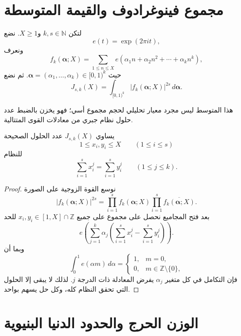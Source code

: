 \section{مجموع فينوغرادوف والقيمة المتوسطة}

\begin{definition}
\label{def:ch25-vinogradov-mean-value}
\provedhere
لتكن \(k,s\in\mathbb N\) و\(X\ge1\). نضع
\[
e(t)=\exp(2\pi i t),
\]
ونعرف
\[
f_k(\boldsymbol\alpha;X)
=
\sum_{1\le n\le X}
e\!\left(\alpha_1n+\alpha_2n^2+\cdots+\alpha_kn^k\right),
\]
حيث \(\boldsymbol\alpha=(\alpha_1,\ldots,\alpha_k)\in[0,1)^k\). ثم نضع
\[
J_{s,k}(X)
=
\int_{[0,1)^k}
\left|f_k(\boldsymbol\alpha;X)\right|^{2s}
\,d\boldsymbol\alpha.
\]
\end{definition}

هذا المتوسط ليس مجرد معيار تحليلي لحجم مجموع أسي؛ فهو يخزن بالضبط عدد حلول نظام جبري من معادلات القوى المتتالية.

\begin{proposition}
\label{prop:ch25-orthogonality-count}
\provedhere
يساوي \(J_{s,k}(X)\) عدد الحلول الصحيحة
\[
1\le x_i,y_i\le X\qquad(1\le i\le s)
\]
للنظام
\[
\sum_{i=1}^{s}x_i^j
=
\sum_{i=1}^{s}y_i^j
\qquad(1\le j\le k).
\]
\end{proposition}

\begin{proof}
نوسع القوة الزوجية على الصورة
\[
|f_k(\boldsymbol\alpha;X)|^{2s}
=
\prod_{i=1}^{s}f_k(\boldsymbol\alpha;X)
\prod_{i=1}^{s}\overline{f_k(\boldsymbol\alpha;X)}.
\]
بعد فتح المجاميع نحصل على مجموع على جميع \(x_i,y_i\in[1,X]\cap\mathbb Z\) للحد
\[
e\!\left(
\sum_{j=1}^{k}\alpha_j
\left(
\sum_{i=1}^{s}x_i^j-
\sum_{i=1}^{s}y_i^j
\right)
\right).
\]
وبما أن
\[
\int_0^1 e(\alpha m)\,d\alpha
=
\begin{cases}
1,&m=0,\\
0,&m\in\mathbb Z\setminus\{0\},
\end{cases}
\]
فإن التكامل في كل متغير \(\alpha_j\) يفرض المعادلة ذات الدرجة \(j\). لذلك لا يبقى إلا الحلول التي تحقق النظام كله، وكل حل يسهم بواحد.
\end{proof}

\section{الوزن الحرج والحدود الدنيا البنيوية}

